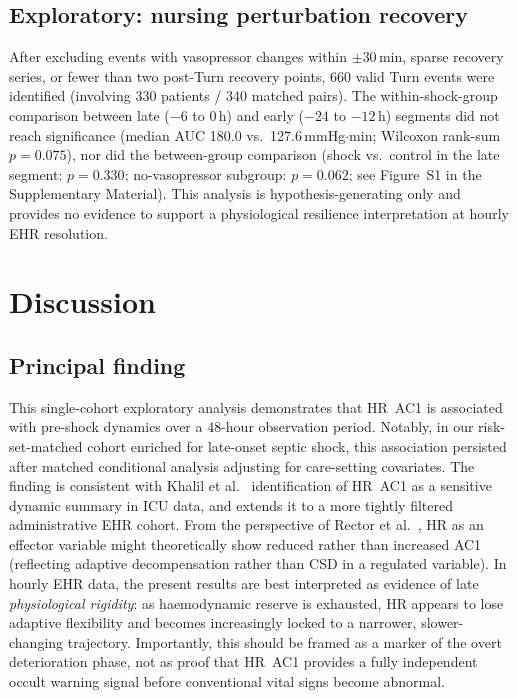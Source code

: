 \documentclass[referee,lineno,pdflatex]{sn-article-template/sn-jnl}
\begin{document}
\subsection{Exploratory: nursing perturbation recovery}
\label{sec:res-perturbation}

After excluding events with vasopressor changes within $\pm$30\,min, sparse recovery series,
or fewer than two post-Turn recovery points, 660 valid Turn events were identified
(involving 330 patients / 340 matched pairs).
The within-shock-group comparison between late ($-6$ to $0$\,h) and early
($-24$ to $-12$\,h) segments did not reach significance
(median AUC 180.0 vs.\ 127.6\,mmHg$\cdot$min; Wilcoxon rank-sum $p = 0.075$),
nor did the between-group comparison (shock vs.\ control in the late segment:
$p = 0.330$; no-vasopressor subgroup: $p = 0.062$; see Figure~S1 in the Supplementary Material).
This analysis is hypothesis-generating only and provides no evidence to support
a physiological resilience interpretation at hourly EHR resolution.

\section{Discussion}
\label{sec:discussion}

\subsection{Principal finding}

This single-cohort exploratory analysis demonstrates that HR~AC1 is associated with
pre-shock dynamics over a 48-hour observation period.
Notably, in our risk-set-matched cohort enriched for late-onset septic shock, this
association persisted after matched conditional analysis adjusting for care-setting covariates.
The finding is consistent with Khalil et al.~\cite{khalil2025}
identification of HR~AC1 as a sensitive dynamic summary in ICU data,
and extends it to a more tightly filtered administrative EHR cohort.
From the perspective of Rector et al.~\cite{rector2021},
HR as an effector variable might theoretically show reduced rather than increased AC1
(reflecting adaptive decompensation rather than CSD in a regulated variable).
In hourly EHR data, the present results are best interpreted as evidence of
late \emph{physiological rigidity}: as haemodynamic reserve is exhausted,
HR appears to lose adaptive flexibility and becomes increasingly locked to a narrower,
slower-changing trajectory.
Importantly, this should be framed as a marker of the overt deterioration phase,
not as proof that HR~AC1 provides a fully independent occult warning signal before
conventional vital signs become abnormal.
\end{document}

